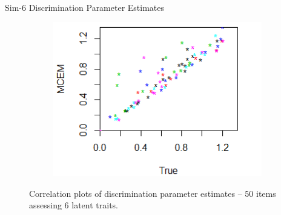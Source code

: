 \documentclass{beamer}
\theoremstyle{definition}
\begin{document}
\begin{frame}{Sim-6 Discrimination Parameter Estimates}
\begin{figure}[h]
\begin{subfigure}{.32\textwidth}
    \end{subfigure}
    \begin{subfigure}{.32\textwidth}
      \centering
      \includegraphics[width=.9\linewidth]{../img/ml_journal_results/6skills/mcem_disc_6skills.png}
    \end{subfigure}
    \caption*{\scriptsize Correlation plots of discrimination parameter estimates -- 50 items assessing 6 latent traits.}
    \label{fig:6skill_cor}
\end{figure}
\end{frame}
\end{document}
